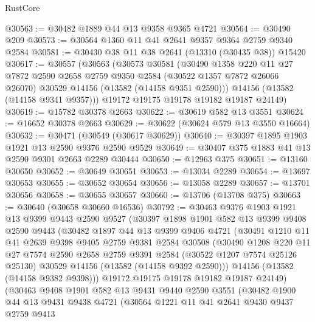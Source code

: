 \begin{lexlean}{RustCore}
\begin{coremodule}
@30563 := @30482 @1889 @44 @13 @9358 @9365 @4721
@30564 := @30490 @209
@30573 := @30564 @1360 @11 @41 @2641 @9357 @9364 @2759 @9340 @2584
@30581 := @30430 @38 @11 @38 @2641 (@13310 (@30435 @38)) @15420
@30617 := @30557
    (@30563
      (@30573
        @30581
        (@30490
          @1358
          @220
          @11
          @27
          @7872
          @2590
          @2658
          @2759
          @9350
          @2584
          (@30522 @1357 @7872 @26066 @26070)
          @30529
          @14156
          (@13582 (@14158 @9351 @2590)))
        @14156
        (@13582 (@14158 @9341 @9357)))
      @19172
      @19175
      @19178
      @19182
      @19187
      @24149)
@30619 := @15782 @30378 @2663
@30622 := @30619 @582 @13 @3551
@30624 := @16652 @30378 @2663
@30629 := @30622 (@30624 @579 @13 @3550 @16664)
@30632 := @30471 (@30549 (@30617 @30629))
@30640 := @30397 @1895 @1903 @1921 @13 @2590 @9376 @2590 @9529
@30649 := @30407 @375 @1883 @41 @13 @2590 @9301 @2663 @2289 @30444
@30650 := @12963 @375
@30651 := @13160 @30650
@30652 := @30649 @30651
@30653 := @13034 @2289
@30654 := @13697 @30653
@30655 := @30652 @30654
@30656 := @13058 @2289
@30657 := @13701 @30656
@30658 := @30655 @30657
@30660 := @13706 (@13708 @375)
@30663 := @30640 (@30658 @30660 @16536)
@30792 := @30463
    @9376
    @1903
    @1921
    @13
    @9399
    @9443
    @2590
    @9527
    (@30397
      @1898
      @1901
      @582
      @13
      @9399
      @9408
      @2590
      @9443
      (@30482
        @1897
        @44
        @13
        @9399
        @9406
        @4721
        (@30491
          @1210
          @11
          @41
          @2639
          @9398
          @9405
          @2759
          @9381
          @2584
          @30508
          (@30490
            @1208
            @220
            @11
            @27
            @7574
            @2590
            @2658
            @2759
            @9391
            @2584
            (@30522 @1207 @7574 @25126 @25130)
            @30529
            @14156
            (@13582 (@14158 @9392 @2590)))
          @14156
          (@13582 (@14158 @9382 @9398)))
        @19172
        @19175
        @19178
        @19182
        @19187
        @24149)
      (@30463
        @9408
        @1901
        @582
        @13
        @9431
        @9440
        @2590
        @3551
        (@30482
          @1900
          @44
          @13
          @9431
          @9438
          @4721
          (@30564
            @1221
            @11
            @41
            @2641
            @9430
            @9437
            @2759
            @9413

\end{coremodule}
\end{lexlean}
